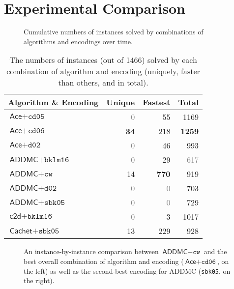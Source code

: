 \documentclass[accepted]{uai2021}
\theoremstyle{definition}
\begin{document}
\section{Experimental Comparison} \label{sec:experiments}

\begin{figure*}[t]
  \centering
  \caption{Cumulative numbers of instances solved by combinations of algorithms
    and encodings over time.}
  \label{fig:cumulative}
\end{figure*}

\begin{table}
  \centering
  \caption{The numbers of instances (out of 1466) solved by
    each combination of algorithm and encoding (uniquely, faster than others, and in total).}%
  \begin{tabular}{lrrr}
    \toprule
    Algorithm \& Encoding & Unique & Fastest & Total \\
    \midrule
    $\textsf{Ace} + \texttt{cd05}$ & \textcolor{gray}{0} & 55 & 1169 \\
    $\textsf{Ace} + \texttt{cd06}$ & \textbf{34} & 218 & \textbf{1259} \\
    $\textsf{Ace} + \texttt{d02}$ & \textcolor{gray}{0} & 46 & 993 \\
    $\textsf{ADDMC} + \texttt{bklm16}$ & \textcolor{gray}{0} & 29 & \textcolor{gray}{617} \\
    $\textsf{ADDMC} + \texttt{cw}$ & 14 & \textbf{770} & 919 \\
    $\textsf{ADDMC} + \texttt{d02}$ & \textcolor{gray}{0} & \textcolor{gray}{0} & 703 \\
    $\textsf{ADDMC} + \texttt{sbk05}$ & \textcolor{gray}{0} & \textcolor{gray}{0} & 729 \\
    $\textsf{c2d} + \texttt{bklm16}$ & \textcolor{gray}{0} & 3 & 1017 \\
    $\textsf{Cachet} + \texttt{sbk05}$ & 13 & 229 & 928 \\
    \bottomrule
  \end{tabular}
  \label{tbl:tallies}
\end{table}

\begin{figure*}[t]
  \centering
  \caption{An instance-by-instance comparison between $\textsf{ADDMC} +
    \texttt{cw}$ and the best overall combination of algorithm and encoding
    ($\textsf{Ace} + \texttt{cd06}$, on the left) as well as the second-best
    encoding for \textsf{ADDMC} (\texttt{sbk05}, on the right).}
  \label{fig:scatter}
\end{figure*}
\end{document}

